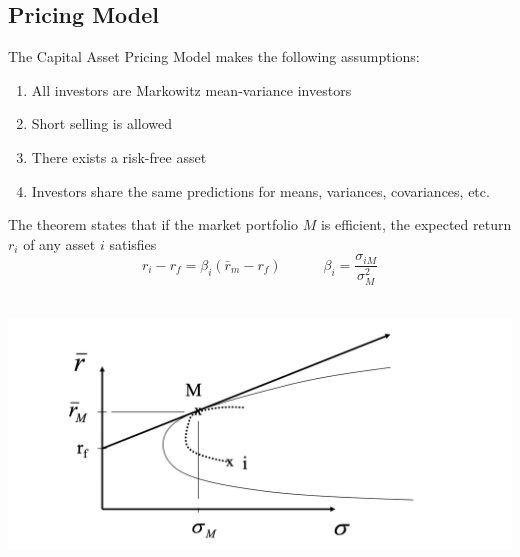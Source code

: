 \documentclass[11pt]{article}
\begin{document}
\subsection{Pricing Model}
The Capital Asset Pricing Model makes the following assumptions:
\begin{enumerate}
\item All investors are Markowitz mean-variance investors
\item Short selling is allowed
\item There exists a risk-free asset 
\item Investors share the same predictions for means, variances, covariances, etc.
\end{enumerate}
The theorem states that if the market portfolio $M$ is efficient, the expected return $r_i$ of any asset $i$ satisfies 
$$ r_i - r_f = \beta_i (\bar{r}_m - r_f) \quad \quad \quad \beta_i = \frac{\sigma_{iM}}{\sigma^2_M}$$  
\\ 
\begin{center}
\includegraphics[scale=0.6]{images/capm.png} 
\end{center}
\end{document}

